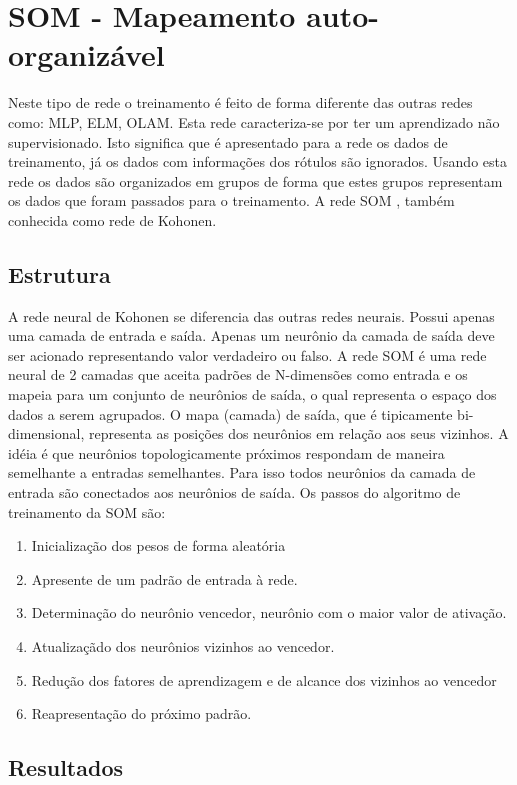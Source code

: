 \documentclass[
	article,			%
	11pt,				%
	oneside,			%
	a4paper,			%
	english,			%
	brazil,				%
	sumario=tradicional
	]{abntex2}
\begin{document}
\newpage

\section*{SOM - Mapeamento auto-organizável} 
Neste tipo de rede o treinamento é feito
de forma diferente das outras redes como: MLP, ELM, OLAM. Esta rede
caracteriza-se por ter um aprendizado não supervisionado.
Isto significa que é apresentado para a rede os dados de treinamento, já os
dados com informações dos rótulos são ignorados. Usando esta rede os dados são
organizados em grupos de forma que estes grupos representam os dados que foram
passados para o treinamento. A rede SOM , também conhecida como rede de Kohonen.
 
\subsection{Estrutura}
A rede neural de Kohonen se diferencia das outras redes neurais. Possui apenas
uma camada de entrada e saída. Apenas um neurônio da camada de saída deve ser
acionado representando valor verdadeiro ou falso.
 A rede SOM é uma rede neural de 2 camadas que aceita padrões de N-dimensões
 como entrada e os mapeia para um conjunto de neurônios de saída, o qual
 representa o espaço dos dados a serem agrupados. O mapa (camada) de saída, que
 é tipicamente bi-dimensional, representa as posições dos neurônios em relação
 aos seus vizinhos. A idéia é que neurônios topologicamente próximos respondam
 de maneira semelhante a entradas semelhantes. Para isso todos neurônios da
 camada de entrada são conectados aos neurônios de saída. 
 Os passos do
 algoritmo de treinamento da SOM são:


\begin{enumerate}
  \item Inicialização dos pesos de forma aleatória
  \item Apresente de um padrão de entrada à rede.
  \item Determinação do neurônio vencedor, neurônio com o maior valor de
  ativação.
  \item Atualizaçãdo dos neurônios vizinhos ao vencedor.
  \item Redução dos fatores de aprendizagem e de alcance dos vizinhos ao
  vencedor
  \item Reapresentação do próximo padrão. 
   
\end{enumerate}
\subsection{Resultados}
\end{document}
